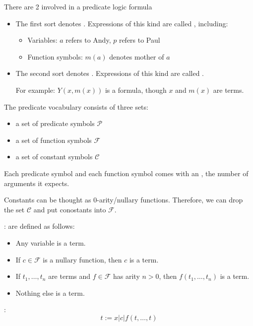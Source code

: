     \par There are 2  involved in a predicate logic formula
    \begin{itemize}
      \item The first sort denotes . Expressions of this kind are called , including:
        \begin{itemize}
          \item Variables: $a$ refers to Andy, $p$ refers to Paul
          \item Function symbols: $m(a)$ denotes mother of $a$
        \end{itemize}
      \item The second sort denotes . Expressions of this kind are called .
        \par For example: $Y(x, m(x))$ is a formula, though $x$ and $m(x)$ are terms.
    \end{itemize}

    \par The predicate vocabulary consists of three sets:
    \begin{itemize}
      \item a set of predicate symbols $\mathcal{P}$
      \item a set of function symbols $\mathcal{F}$
      \item a set of constant symbols $\mathcal{C}$
    \end{itemize}
    \par Each predicate symbol and each function symbol comes with an , the number of arguments it expects.
    \par Constants can be thought as 0-arity/nullary functions. Therefore, we can drop the set $\mathcal{C}$ and put conostants into $\mathcal{F}$.

    :  are defined as follows:
    \begin{itemize}
      \item Any variable is a term.
      \item If $c \in \mathcal{F}$ is a nullary function, then $c$ is a term.
      \item If $t_1, \ldots, t_n$ are terms and $f \in \mathcal{F}$ has arity $n > 0$, then $f(t_1, \ldots, t_n)$ is a term.
      \item Nothing else is a term.
    \end{itemize}
    \par {}:
      \[
        t := x | c | f(t, \ldots, t)
      \]

